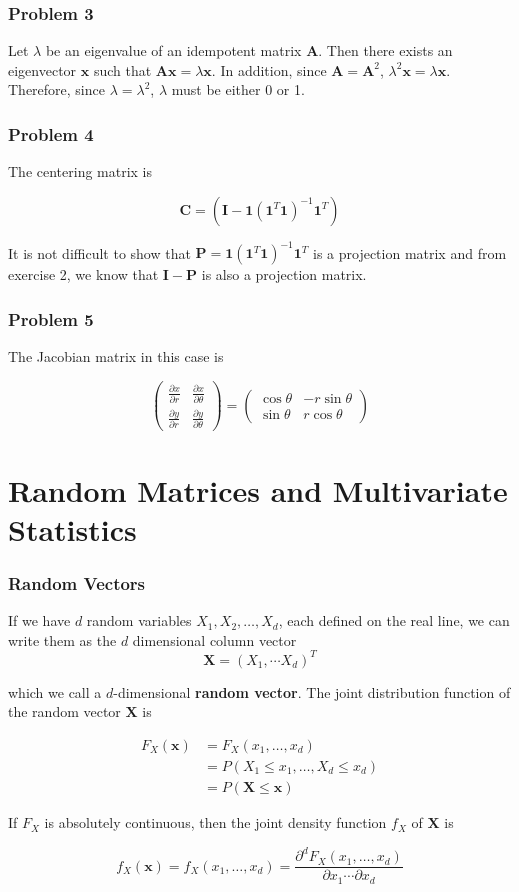 \documentclass{beamer}
\begin{document}
\begin{frame}
\frametitle{Problem 3}
Let $\lambda$ be an eigenvalue of an idempotent matrix $\mathbf{A}$.  Then there exists an eigenvector $\mathbf{x}$ such that $\mathbf{Ax} = \lambda \mathbf{x}$.  In addition, since $\mathbf{A} = \mathbf{A}^2$, $\lambda^2 \mathbf{x} = \lambda \mathbf{x}$.  Therefore, since $\lambda = \lambda^2$, $\lambda$ must be either 0 or 1.
\end{frame}

\begin{frame}
\frametitle{Problem 4}
The centering matrix is 

$$\mathbf{C} = (\mathbf{I} - \mathbf{1}(\mathbf{1}^T \mathbf{1})^{-1} \mathbf{1}^T)$$

It is not difficult to show that $\mathbf{P} = \mathbf{1}(\mathbf{1}^T \mathbf{1})^{-1} \mathbf{1}^T$ is a projection matrix and from exercise 2, we know that $\mathbf{I} - \mathbf{P}$ is also a projection matrix.
\end{frame}

\begin{frame}
\frametitle{Problem 5}
The Jacobian matrix in this case is

$$\begin{pmatrix} \frac{\partial x}{\partial r} & \frac{\partial x}{\partial \theta} \\ \frac{\partial y}{\partial r} & \frac{\partial y}{\partial \theta}\end{pmatrix} = \begin{pmatrix} \cos \theta & -r \sin \theta \\ \sin \theta & r \cos \theta \end{pmatrix}$$
\end{frame}

\section{Random Matrices and Multivariate Statistics}
\begin{frame}
\frametitle{Random Vectors}
If we have $d$ random variables $X_1, X_2, \hdots, X_d$, each defined on the real line, we can write them as the $d$ dimensional column vector $$\mathbf{X} = (X_1, \cdots X_d)^T$$

which we call a $d$-dimensional \textbf{random vector}.  The joint distribution function of the random vector $\mathbf{X}$ is

\begin{align*}
F_X(\mathbf{x}) &= F_X(x_1, \hdots, x_d) \\
&= P(X_1 \leq x_1, \hdots, X_d \leq x_d)\\
&= P(\mathbf{X} \leq \mathbf{x})
\end{align*}

If $F_X$ is absolutely continuous, then the joint density function $f_X$ of $\mathbf{X}$ is

$$f_X(\mathbf{x}) = f_X(x_1, \hdots, x_d) = \frac{\partial ^d F_X(x_1, \hdots, x_d)}{\partial x_1 \cdots \partial x_d}$$
\end{frame}
\end{document}
